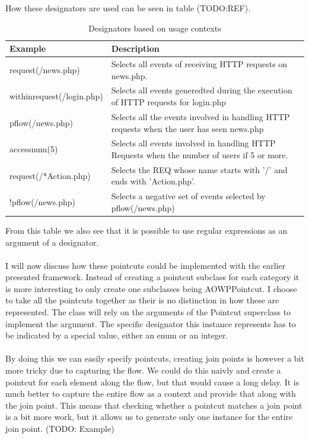 \documentclass[a4paper]{report}
\begin{document}
How these designators are used can be seen in table (TODO:REF).
\begin{table}
\centering
\begin{tabular}{l|p{7cm}}
\hline
Example & Description\\
\hline
\hline
request(/news.php) & Selects all events of receiving HTTP requests on news.php.\\
\hline
withinrequest(/login.php) & Selects all events generedted during the execution of HTTP requests for login.php\\
\hline
pflow(/news.php) & Selects all the events involved in handling HTTP requests when the user has seen news.php\\
\hline
accessnum(5) & Selects all events involved in handling HTTP Requests when the number of users if 5 or more.\\
\hline
request(/*Action.php) & Selects the REQ whose name starts with '/' and ends with 'Action.php'.\\
\hline
!pflow(/news.php) & Selects a negative set of events selected by pflow(/news.php)\\
\hline
\end{tabular}
\caption{Designators based on usage contexts}
\label{tab:Designators_AOWP_Contexts}
\end{table}
From this table we also see that it is possible to use regular expressions as an argument of a designator.\\
\\
I will now discuss how these pointcuts could be implemented with the earlier presented framework. Instead of creating a pointcut subclass for each category it is more interesting to only create one subclasses being AOWPPointcut. I choose to take all the pointcuts together as their is no distinction in how these are represented. The class will rely on the arguments of the Pointcut superclass to implement the argument. The specific designator this instance represents has to be indicated by a special value, either an enum or an integer.\\
\\
By doing this we can easily specify pointcuts, creating join points is however a bit more tricky due to capturing the flow. We could do this naivly and create a pointcut for each element along the flow, but that would cause a long delay. It is much better to capture the entire flow as a context and provide that along with the join point. This means that checking whether a pointcut matches a join point is a bit more work, but it allows us to generate only one instance for the entire join point. (TODO: Example)\\
\end{document}
